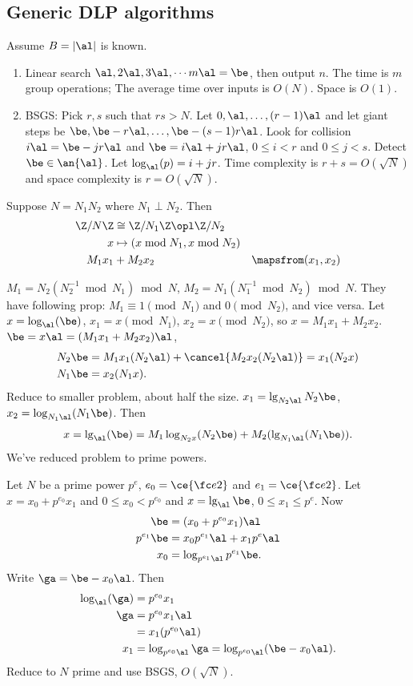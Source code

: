 \subsection{Generic DLP algorithms}
Assume $B=|\al|$ is known.
\begin{enumerate}
\item Linear search $\al,2\al,3\al,\cdots m\al=\be$, then output $n$. The time is $m$ group operations; The average time over inputs is $O(N)$. Space is $O(1)$.
\item BSGS: Pick $r,s$ such that $rs>N$. Let $0,\al,\ldots, (r-1)\al$ and let giant steps be $\be,\be-r\al,\ldots, \be-(s-1)r\al$. Look for collision $i\al=\be-jr\al$  and $\be=i\al+jr\al$, $0\le i<r$ and $0\le j<s$. Detect $\be \in \an{\al}$. Let $\log_{\al}(p)=i+jr$. Time complexity is $r+s=O(\sqrt N)$ and space complexity is $r=O(\sqrt N)$.
\end{enumerate}
\begin{alg}
Suppose $N=N_1N_2$ where $N_1\perp N_2$. Then 
\begin{align*}
\Z/N\Z&\cong \Z/N_1\Z\opl \Z/N_2\\
x&\mapsto (x\bmod{N_1},x\bmod{N_2})\\
M_1x_1&+M_2x_2&\mapsfrom (x_1,x_2)
\end{align*}
\end{alg}
$M_1=N_2(N_2^{-1}\bmod{N_1})\bmod N$, $M_2=N_1(N_1^{-1}\bmod{N_2})\bmod N$. 
They have following prop: $M_1\equiv 1\pmod{N_1}$ and $0\pmod{N_2}$, and vice versa. Let $x=\log_{\al}(\be)$, $x_1=x\pmod{N_1}$, $x_2=x\pmod{N_2}$, so $x=M_1x_1+M_2x_2$. $\be=x\al=(M_1x_1+M_2x_2)\al$, 
\begin{align*}
N_2\be & = M_1x_1(N_2\al)+\cancel{M_2x_2(N_2\al)} = x_1(N_2x)\\
N_1\be & = x_2(N_1x).
\end{align*}
Reduce to smaller problem, about half the size. $x_1=\lg_{N_2\al} N_2\be$, $x_2=\log_{N_1\al}(N_1\be)$. Then
\[
x=\lg_{\al}(\be)=M_1\log_{N_2x}(N_2\be)+M_2(\lg_{N_1\al}(N_1\be)).
\]
We've reduced problem to prime powers.

Let $N$ be a prime power $p^e$, $e_0=\ce{\fc e2}$ and $e_1=\ce{\fc e2}$. Let $x=x_0+p^{e_0}x_1$ and $0\le x_0<p^{e_0}$ and $x=\lg_{\al}\be$, $0\le x_1\le p^e$. Now
\begin{align*}
\be&= (x_0+p^{e_0}x_1)\al\\
p^{e_1}\be & = x_0p^{e_1}\al+ x_1p^e\al\\
x_0&=\log_{p^{e_1}\al} p^{e_1}\be.
\end{align*}
Write $\ga=\be-x_0\al$. Then
\begin{align*}
\log_{\al}(\ga)&=p^{e_0}x_1\\
\ga&=p^{e_0}x_1\al\\
&=x_1(p^{e_0}\al)\\
x_1&=\log_{p^{e_0}\al}\ga =\log_{p^{e_0}\al} (\be-x_0\al).
\end{align*}
Reduce to $N$ prime and use BSGS, $O(\sqrt N)$.

